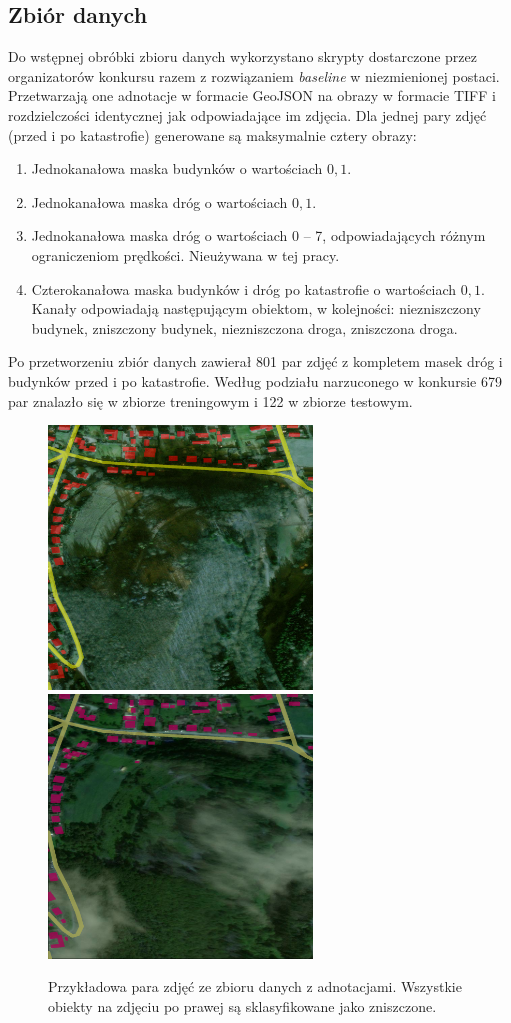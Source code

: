 \subsection{Zbiór danych}
Do wstępnej obróbki zbioru danych wykorzystano skrypty dostarczone przez organizatorów konkursu razem z rozwiązaniem \textit{baseline} w niezmienionej postaci. Przetwarzają one adnotacje w formacie GeoJSON na obrazy w formacie TIFF i rozdzielczości identycznej jak odpowiadające im zdjęcia. Dla jednej pary zdjęć (przed i po katastrofie) generowane są maksymalnie cztery obrazy:
\begin{enumerate}
\item Jednokanałowa maska budynków o wartościach $0, 1$.
\item Jednokanałowa maska dróg o wartościach $0, 1$.
\item Jednokanałowa maska dróg o wartościach 0 -- 7, odpowiadających różnym ograniczeniom prędkości. Nieużywana w tej pracy.
\item Czterokanałowa maska budynków i dróg po katastrofie o wartościach $0, 1$. Kanały odpowiadają następującym obiektom, w kolejności: niezniszczony budynek, zniszczony budynek, niezniszczona droga, zniszczona droga.
\end{enumerate}
Po przetworzeniu zbiór danych zawierał 801 par zdjęć z kompletem masek dróg i budynków przed i po katastrofie. Według podziału narzuconego w konkursie 679 par znalazło się w zbiorze treningowym i 122 w zbiorze testowym.\\
\begin{figure}[h]
\centering
\includegraphics[width=7cm,height=7cm]{rysunki/10500500C4DD7000_0_30_69_PRE.png}
\includegraphics[width=7cm,height=7cm]{rysunki/10500500C4DD7000_0_30_69_POST.png}
\caption[Wizualizacja danych]{Przykładowa para zdjęć ze zbioru danych z adnotacjami. Wszystkie obiekty na zdjęciu po prawej są sklasyfikowane jako zniszczone.}
\end{figure}
